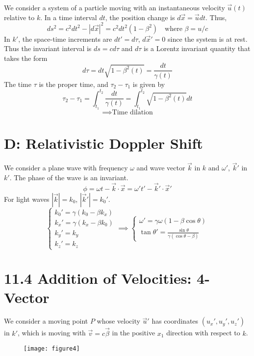 \documentclass{article}
\begin{document}
	We consider a system of a particle moving with an instantaneous velocity $\vec{u}(t)$ relative to $k$.
	In a time interval $dt$, the position change is $d\vec{x} = \vec{u}dt$. Thus,
	\[ ds^2 = c^2 dt^2 - |d\vec{x}|^2 = c^2 dt^2 (1 - \beta^2) \quad \text{where } \beta = u/c \]
	In $k'$, the space-time increments are $dt' = d\tau$, $d\vec{x}' = 0$ since the system is at rest. Thus the invariant interval is $ds = c d\tau$ and $d\tau$ is a Lorentz invariant quantity that takes the form
	\[ d\tau = dt\sqrt{1 - \beta^2(t)} = \frac{dt}{\gamma(t)} \]
	The time $\tau$ is the proper time, and $\tau_2 - \tau_1$ is given by
	\[ \tau_2 - \tau_1 = \int_{t_1}^{t_2} \frac{dt}{\gamma(t)} = \int_{t_1}^{t_2} \sqrt{1 - \beta^2(t)} dt \]
	\[ \implies \text{Time dilation} \]
	
	\section*{D: Relativistic Doppler Shift}
	We consider a plane wave with frequency $\omega$ and wave vector $\vec{k}$ in $k$ and $\omega'$, $\vec{k}'$ in $k'$.
	The phase of the wave is an invariant.
	\[ \phi = \omega t - \vec{k} \cdot \vec{x} = \omega' t' - \vec{k}' \cdot \vec{x}' \]
	For light waves $|\vec{k}| = k_0$, $|\vec{k}'| = k_0'$.
	\[
	\begin{cases}
		k_0' = \gamma (k_0 - \beta k_x) \\
		k_x' = \gamma (k_x - \beta k_0) \\
		k_y' = k_y \\
		k_z' = k_z
	\end{cases}
	\implies
	\begin{cases}
		\omega' = \gamma \omega (1 - \beta \cos\theta) \\
		\tan\theta' = \frac{\sin\theta}{\gamma(\cos\theta - \beta)}
	\end{cases}
	\]
	
	\section*{11.4 Addition of Velocities: 4-Vector}
	We consider a moving point $P$ whose velocity $\vec{u}'$ has coordinates $(u_x', u_y', u_z')$ in $k'$, which is moving with $\vec{v} = c\vec{\beta}$ in the positive $x_1$ direction with respect to $k$.
	
	\begin{figure}[h]
		\centering
		\texttt{[image: figure4]}
		\caption{}
		\label{fig:figure4}
	\end{figure}
	
\end{document}
